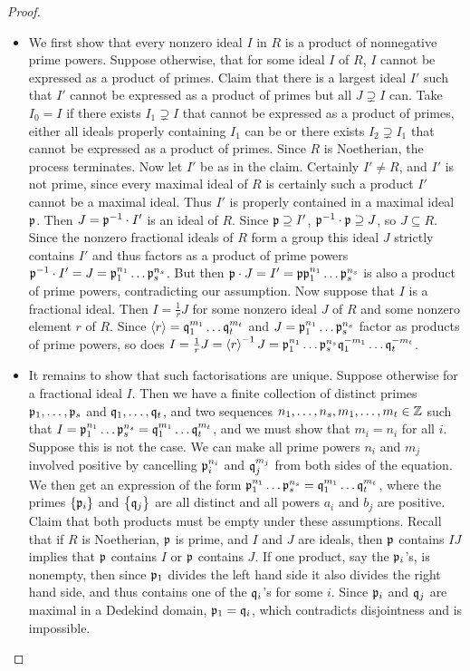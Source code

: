 \begin{proof}
\hfill
\begin{itemize}
\item We first show that every nonzero ideal $ I $ in $ R $ is a product of nonnegative prime powers. Suppose otherwise, that for some ideal $ I $ of $ R $, $ I $ cannot be expressed as a product of primes. Claim that there is a largest ideal $ I' $ such that $ I' $ cannot be expressed as a product of primes but all $ J \supsetneq I $ can. Take $ I_0 = I $ if there exists $ I_1 \supsetneq I $ that cannot be expressed as a product of primes, either all ideals properly containing $ I_1 $ can be or there exists $ I_2 \supsetneq I_1 $ that cannot be expressed as a product of primes. Since $ R $ is Noetherian, the process terminates. Now let $ I' $ be as in the claim. Certainly $ I' \ne R $, and $ I' $ is not prime, since every maximal ideal of $ R $ is certainly such a product $ I' $ cannot be a maximal ideal. Thus $ I' $ is properly contained in a maximal ideal $ \mathfrak{p} $. Then $ J = \mathfrak{p}^{-1} \cdot I' $ is an ideal of $ R $. Since $ \mathfrak{p} \supseteq I' $, $ \mathfrak{p}^{-1} \cdot \mathfrak{p} \supseteq J $, so $ J \subseteq R $. Since the nonzero fractional ideals of $ R $ form a group this ideal $ J $ strictly contains $ I' $ and thus factors as a product of prime powers $ \mathfrak{p}^{-1} \cdot I' = J = \mathfrak{p}_1^{n_1} \dots \mathfrak{p}_s^{n_s} $. But then $ \mathfrak{p} \cdot J = I' = \mathfrak{p}\mathfrak{p}_1^{n_1} \dots \mathfrak{p}_s^{n_s} $ is also a product of prime powers, contradicting our assumption. Now suppose that $ I $ is a fractional ideal. Then $ I = \tfrac{1}{r}J $ for some nonzero ideal $ J $ of $ R $ and some nonzero element $ r $ of $ R $. Since $ \left\langle r \right\rangle = \mathfrak{q}_1^{m_1} \dots \mathfrak{q}_t^{m_t} $ and $ J = \mathfrak{p}_1^{n_1} \dots \mathfrak{p}_s^{n_s} $ factor as products of prime powers, so does $ I = \tfrac{1}{r}J = \left\langle r \right\rangle^{-1}J = \mathfrak{p}_1^{n_1} \dots \mathfrak{p}_s^{n_s}\mathfrak{q}_1^{-m_1} \dots \mathfrak{q}_t^{-m_t} $.
\item It remains to show that such factorisations are unique. Suppose otherwise for a fractional ideal $ I $. Then we have a finite collection of distinct primes $ \mathfrak{p}_1, \dots, \mathfrak{p}_s $ and $ \mathfrak{q}_1, \dots, \mathfrak{q}_t $, and two sequences $ n_1, \dots, n_s, m_1, \dots, m_t \in \mathbb{Z} $ such that $ I = \mathfrak{p}_1^{n_1} \dots \mathfrak{p}_s^{n_s} = \mathfrak{q}_1^{m_1} \dots \mathfrak{q}_t^{m_t} $, and we must show that $ m_i = n_i $ for all $ i $. Suppose this is not the case. We can make all prime powers $ n_i $ and $ m_j $ involved positive by cancelling $ \mathfrak{p}_i^{n_i} $ and $ \mathfrak{q}_j^{m_j} $ from both sides of the equation. We then get an expression of the form $ \mathfrak{p}_1^{n_1} \dots \mathfrak{p}_s^{n_s} = \mathfrak{q}_1^{m_1} \dots \mathfrak{q}_t^{m_t} $, where the primes $ \cbr{\ppp_i} $ and $ \cbr{\qqq_j} $ are all distinct and all powers $ a_i $ and $ b_j $ are positive. Claim that both products must be empty under these assumptions. Recall that if $ R $ is Noetherian, $ \mathfrak{p} $ is prime, and $ I $ and $ J $ are ideals, then $ \mathfrak{p} $ contains $ IJ $ implies that $ \mathfrak{p} $ contains $ I $ or $ \mathfrak{p} $ contains $ J $. If one product, say the $ \mathfrak{p}_i $'s, is nonempty, then since $ \mathfrak{p}_1 $ divides the left hand side it also divides the right hand side, and thus contains one of the $ \mathfrak{q}_i $'s for some $ i $. Since $ \mathfrak{p}_i $ and $ \mathfrak{q}_j $ are maximal in a Dedekind domain, $ \mathfrak{p}_1 = \mathfrak{q}_i $, which contradicts disjointness and is impossible.

\end{itemize}
\end{proof}
